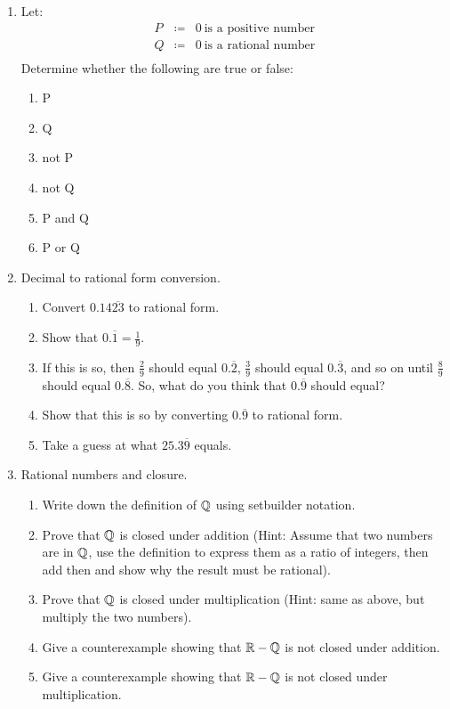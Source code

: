 \documentclass[letterpaper,12pt,fleqn]{article}
\begin{document}
\begin{enumerate}
\item Let:
\begin{eqnarray*}
P &\coloneqq& 0\ \mbox{is a positive number} \\
Q &\coloneqq& 0\ \mbox{is a rational number} \\
\end{eqnarray*}
Determine whether the following are true or false:
\begin{enumerate}
  \item P
  \item Q
  \item not P
  \item not Q
  \item P and Q
  \item P or Q
\end{enumerate}

\item Decimal to rational form conversion.
\begin{enumerate}
\item Convert $0.14\overline{23}$ to rational form.

\item Show that $0.\overline{1} = \frac{1}{9}$.

\item If this is so, then $\frac{2}{9}$ should equal $0.\overline{2}$,
  $\frac{3}{9}$ should equal $0.\overline{3}$, and so on until $\frac{8}{9}$
  should equal $0.\overline{8}$. So, what do you think that $0.\overline{9}$
  should equal?

\item Show that this is so by converting $0.\overline{9}$ to rational form.

\item Take a guess at what $25.3\overline{9}$ equals.
\end{enumerate}
\newpage
\item Rational numbers and closure.
  \begin{enumerate}
  \item Write down the definition of $\mathbb{Q}$ using setbuilder notation.
  \item Prove that $\mathbb{Q}$ is closed under addition (Hint: Assume that two numbers
    are in $\mathbb{Q}$, use the definition to express them as a ratio of integers,
    then add then and show why the result must be rational).
  \item Prove that $\mathbb{Q}$ is closed under multiplication (Hint: same as above,
    but multiply the two numbers).
  \item Give a counterexample showing that $\mathbb{R}-\mathbb{Q}$ is not closed under addition.
  \item Give a counterexample showing that $\mathbb{R}-\mathbb{Q}$ is not closed under
    multiplication.
  \end{enumerate}


\end{enumerate}
\end{document}
